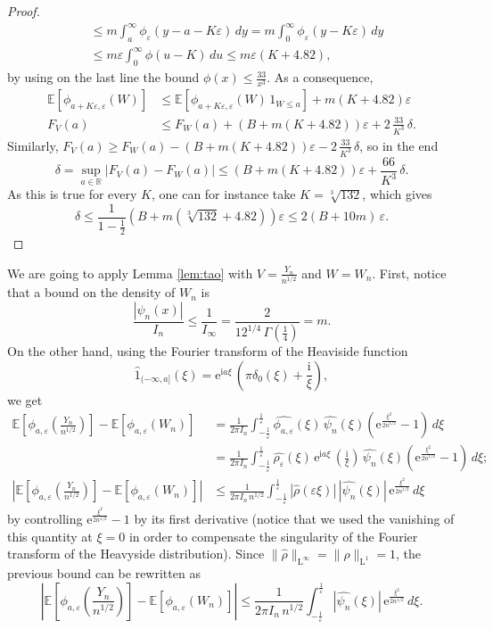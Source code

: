 \documentclass[12pt,a4paper,reqno]{amsart}
\newcommand{\R}{\mathbb{R}}
\newcommand{\E}{\mathrm{e}}
\newcommand{\I}{\mathrm{i}}
\newcommand{\esper}{\mathbb{E}}
\newcommand{\eps}{\varepsilon}
\theoremstyle{remark}
\begin{document}
\begin{proof}
\begin{align*}
&\leq m\int_{a}^\infty \phi_{\eps}(y-a-K\eps)\,dy = m\int_0^\infty \phi_\eps(y-K\eps)\,dy\\
&\leq m\eps \int_0^\infty \phi(u-K)\,du \leq m \eps \left(K+4.82\right),
\end{align*}
by using on the last line the bound $\phi(x) \leq \frac{33}{x^3}$. As a consequence,
\begin{align*}
\esper[\phi_{a+K\eps,\eps}(W)] &\leq \esper[\phi_{a+K\eps,\eps}(W)\,1_{W \leq a}] + m\left(K+4.82\right)\eps\\
F_V(a)&\leq F_W(a) + \left(B+m\left(K+4.82\right)\right) \eps + 2\,\frac{33}{K^3}\,\delta.
\end{align*}
Similarly, $F_V(a)\geq F_W(a) - (B+m(K+4.82)) \eps - 2\,\frac{33}{K^3}\,\delta$, so in the end
$$\delta = \sup_{a \in \R}|F_V(a)-F_W(a)| \leq \left(B+m\left(K+4.82\right)\right)\eps + \frac{66}{K^3}\,\delta.$$\bigskip
As this is true for every $K$, one can for instance take $K=\sqrt[3]{132}$, which gives 
$$\delta \leq \frac{1}{1-\frac{1}{2}}\left(B+m\left(\sqrt[3]{132}+4.82\right)\right)\eps \leq  2(B + 10m)\,\eps.$$
\end{proof}
\bigskip

We are going to apply Lemma \ref{lem:tao} with $V=\frac{Y_n}{n^{1/2}}$ and $W=W_n$. First, notice that a bound on the density of $W_n$ is
$$\frac{|\psi_n(x)|}{I_n}\leq \frac{1}{I_\infty}=\frac{2}{12^{1/4}\,\Gamma(\frac{1}{4})}=m.$$
On the other hand, using the Fourier transform of the Heaviside function
$$
\widehat{1}_{(-\infty,a]}(\xi)=\E^{\I a \xi}\,\left(\pi\delta_0(\xi)+\frac{\I}{\xi}\right),
$$
we get
\begin{align*}
\esper\left[\phi_{a,\eps}\!\left(\frac{Y_n}{n^{1/2}}\right)\right]-\esper[\phi_{a,\eps}(W_n)] &= \frac{1}{2\pi I_n} \int_{-\frac{1}{\eps}}^{\frac{1}{\eps}} \widehat{\phi_{a,\eps}}(\xi)\,\widehat{\psi_n}(\xi) \left(\E^{\frac{\xi^2}{2n^{1/2}}}-1\right)\,d\xi\\
&=\frac{1}{2\pi I_n} \int_{-\frac{1}{\eps}}^{\frac{1}{\eps}} \widehat{\rho_{\eps}}(\xi)\,\E^{\I a\xi}\,\left(\frac{\I}{\xi}\right)\,\widehat{\psi_n}(\xi) \left(\E^{\frac{\xi^2}{2n^{1/2}}}-1\right)\,d\xi ;\\
\left| \esper\!\left[\phi_{a,\eps}\!\left(\frac{Y_n}{n^{1/2}}\right)\right]-\esper[\phi_{a,\eps}(W_n)]\right| &\leq \frac{1}{2\pi I_n\,n^{1/2}} \int_{-\frac{1}{\eps}}^{\frac{1}{\eps}} |\widehat{\rho}(\eps\xi)|\, |\widehat{\psi_n}(\xi)|\,\E^{\frac{\xi^2}{2n^{1/2}}}\,d\xi
\end{align*}
by controlling $\E^{\frac{\xi^2}{2n^{1/2}}}-1$ by its first derivative (notice that we used the vanishing of this quantity at $\xi=0$ in order to compensate the singularity of the Fourier transform of the Heavyside distribution). Since $\|\widehat{\rho}\|_{\mathrm{L}^\infty}=\|\rho\|_{\mathrm{L}^1}=1$, the previous bound can be rewritten as
$$
\left| \esper\!\left[\phi_{a,\eps}\!\left(\frac{Y_n}{n^{1/2}}\right)\right]-\esper[\phi_{a,\eps}(W_n)]\right| \leq \frac{1}{2\pi I_n\,n^{1/2}} \int_{-\frac{1}{\eps}}^{\frac{1}{\eps}} |\widehat{\psi_n}(\xi)|\,\E^{\frac{\xi^2}{2n^{1/2}}}\,d\xi.
$$\bigskip
\end{document}
